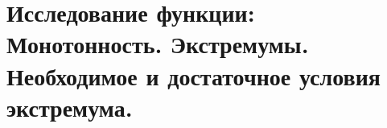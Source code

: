 \section{Исследование функции: Монотонность. Экстремумы. Необходимое и достаточное условия экстремума.}

\pagebreak